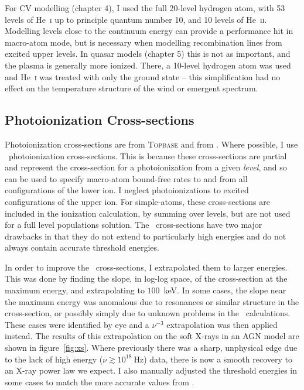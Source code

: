 For CV modelling (chapter 4), I used the full 20-level hydrogen atom, with 53 levels of 
He~\textsc{i} up to principle quantum number 10, and 10 levels of He~\textsc{ii}. 
Modelling levels close to the continuum energy can
provide a performance hit in macro-atom mode, but is necessary
when modelling recombination lines from excited 
upper levels. In quasar models (chapter 5) 
this is not as important, and the
plasma is generally more ionized. There, a 10-level hydrogen atom was used and
He~\textsc{i} was treated with only the ground state -- this simplification
had no effect on the temperature structure of the wind or emergent spectrum.

\subsection{Photoionization Cross-sections}

Photoionization cross-sections are from \textsc{Topbase} \citep{cunto1993} and from 
\cite{vfky}. Where possible, I use \top\ photoionization cross-sections. This is because
these cross-sections are partial and represent the cross-section for a photoionization
from a given {\em level}, and so can be used to specify macro-atom 
bound-free rates to and from all configurations of the lower ion. 
I neglect photoionizations to excited configurations
of the upper ion. For simple-atoms, these cross-sections are included in the ionization
calculation, by summing over levels, but are not used for a full level populations solution.
The \top\ cross-sections have two major drawbacks in that they do not 
extend to particularly high energies and do not always contain accurate threshold
energies.

In order to improve the \top\ cross-sections, I extrapolated them to larger
energies. This was done by finding the slope, in log-log space,
of the cross-section at the maximum energy, and extrapolating to $100$~keV.
In some cases, the slope near the maximum energy was anomalous 
due to resonances or similar structure in the cross-section, or possibly
simply due to unknown problems in the \top\ calculations. These
cases were identified by eye and a $\nu^{-3}$ extrapolation
was then applied instead. 
The results of this extrapolation on the soft X-rays in an AGN model
are shown in figure~\ref{fig:xs}. Where previously there was a sharp,
unphysical edge due to the lack of high energy 
($\nu \gtrsim 10^{18}~\mathrm{Hz}$) data, 
there is now a smooth recovery to an X-ray 
power law we expect. I also manually adjusted the threshold energies in some
cases to match the more accurate values from \cite{vfky}.

